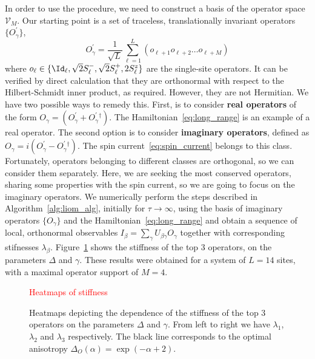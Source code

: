 In order to use the procedure, we need to construct a basis of the operator space \(\mathcal{V}_M\).
Our starting point is a set of traceless, translationally invariant operators \(\{O^{\prime}_{\gamma}\}\),
\begin{equation}
  O^{\prime}_{\gamma} = \frac{1}{\sqrt{L}}\sum_{\ell=1}^L\left( o_{\ell+1}o_{\ell+2}\ldots o_{\ell+M} \right)
  \label{eq:operator_basis}
\end{equation}
where \(o_{\ell} \in \{\Id_{\ell}, \sqrt{2}\Sm_{\ell},\sqrt{2}\Sp_{\ell},2\Sz_{\ell}\}\) are the single-site operators.
It can be verified by direct calculation that they are orthonormal with respect to the Hilbert-Schmidt inner product,
as required. However, they are not Hermitian. We have two possible ways to remedy this. First, is
to consider \textbf{real operators} of the form \(O_{\gamma} = (O^{\prime}_{\gamma} + O^{\prime}_{\gamma}{}^{\dag})\).
The Hamiltonian~\eqref{eq:long_range} is an example of a real operator. The second option is to consider \textbf{imaginary operators},
defined as \(O_{\gamma} = i(O^{\prime}_{\gamma} - O^{\prime}_{\gamma}{}^{\dag})\). The spin current~\eqref{eq:spin_current}
belongs to this class. Fortunately, operators belonging to different classes are orthogonal, so we can
consider them separately. Here, we are seeking the most conserved operators, sharing some properties with
the spin current, so we are going to focus on the imaginary operators. We numerically perform the steps
described in Algorithm~\ref{alg:liom_alg}, initially for \(\tau\to\infty\), using the basis of imaginary operators \(\{O_{\gamma}\}\)
and the Hamiltonian~\eqref{eq:long_range} and obtain a sequence of local, orthonormal observables
\(I_{\beta} = \sum_{\gamma} U_{\beta\gamma} O_{\gamma}\) together with corresponding stifnesses \(\lambda_{\beta}\).
Figure~\ref{fig:stiffness} shows the stiffness of the top 3 operators, on the parameters \(\Delta\) and \(\gamma\).
These results were obtained for a system of \(L=14\) sites, with a maximal operator support of \(M=4\).

\begin{figure}[htbp]
  \centering
  \textcolor{red}{Heatmaps of stiffness}
  \caption{Heatmaps depicting the dependence of the stiffness of the top 3 operators on the parameters \(\Delta\) and \(\gamma\).
  From left to right we have \(\lambda_1\), \(\lambda_2\) and \(\lambda_3\) respectively. The black line corresponds
  to the optimal anisotropy \(\Delta_{O}(\alpha) = \exp(-\alpha + 2)\).}
  \label{fig:stiffness}
\end{figure}

